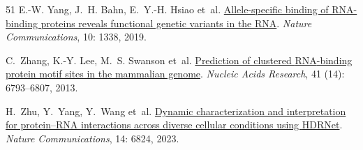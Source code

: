 \begin{thebibliography}{51}
E.-W. Yang, J.~H. Bahn, E.~Y.-H. Hsiao et~al.
\newblock \href{https://doi.org/10.1038/s41467-019-09292-w}{Allele-specific
  binding of RNA-binding proteins reveals functional genetic variants in the
  RNA}.
\newblock \emph{Nature Communications}, 10: 1338, 2019.

C.~Zhang, K.-Y. Lee, M.~S. Swanson et~al.
\newblock \href{https://doi.org/10.1093/nar/gkt421}{Prediction of clustered
  {RNA}-binding protein motif sites in the mammalian genome}.
\newblock \emph{Nucleic Acids Research}, 41 (14): 6793--6807,
  2013.

H.~Zhu, Y.~Yang, Y.~Wang et~al.
\newblock \href{https://doi.org/10.1038/s41467-023-42547-1}{Dynamic
  characterization and interpretation for protein--RNA interactions across
  diverse cellular conditions using {HDRNet}}.
\newblock \emph{Nature Communications}, 14: 6824, 2023.

\end{thebibliography}
